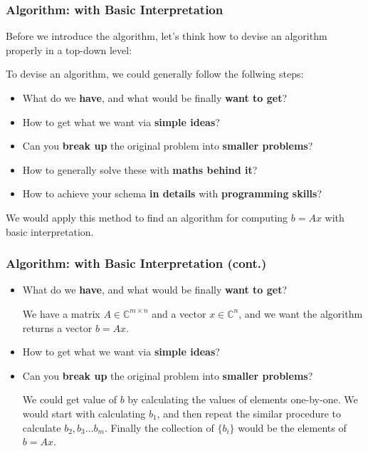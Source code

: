 \documentclass{beamer}
\begin{document}
\begin{frame}
    \frametitle{Algorithm: with Basic Interpretation}
    Before we introduce the algorithm, let's think how to devise an algorithm properly in a top-down level: \medskip
    
    \noindent To devise an algorithm, we could generally follow the follwing steps:
    \begin{itemize}
        \item What do we \textbf{have}, and what would be finally \textbf{want to get}? 
        \item How to get what we want via \textbf{simple ideas}?
        \item Can you \textbf{break up} the original problem into \textbf{smaller problems}?
        \item How to generally solve these with \textbf{maths behind it}?
        \item How to achieve your schema \textbf{in details} with \textbf{programming skills}?
    \end{itemize}
    We would apply this method to find an algorithm for computing \(b = Ax\) with basic interpretation.
\end{frame}

\begin{frame}
    \frametitle{Algorithm: with Basic Interpretation (cont.)}
    \begin{itemize}
        \item What do we \textbf{have}, and what would be finally \textbf{want to get}? \medskip
        
        \noindent We have a matrix \(A \in \mathbb{C}^{m \times  n}\) and a vector \(x \in \mathbb{C}^{n}\), and we want the algorithm returns a vector \(b = Ax\).

        \item How to get what we want via \textbf{simple ideas}?
        \item Can you \textbf{break up} the original problem into \textbf{smaller problems}? \medskip
        
        \noindent We could get value of \(b\) by calculating the values of elements one-by-one. We would start with calculating \(b_1\), and then repeat the similar procedure to calculate \(b_2, b_3 \ldots b_m\). Finally the collection of \(\{b_{i}\} \) would be the elements of \(b = Ax\).   
    \end{itemize}
    
\end{frame}
\end{document}
